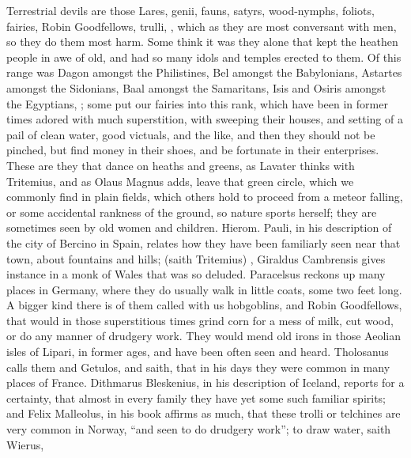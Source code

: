 Terrestrial devils are those Lares, genii, fauns, satyrs,
wood-nymphs, foliots, fairies, Robin Goodfellows, trulli,
\etc{}, which as they are most conversant with men, so they do them most harm.
Some think it was they alone that kept the heathen people in awe of old, and
had so many idols and temples erected to them. Of this range was Dagon amongst
the Philistines, Bel amongst the Babylonians, Astartes amongst the Sidonians,
Baal amongst the Samaritans, Isis and Osiris amongst the Egyptians, \etc{};
some put our fairies into this rank, which have been in
former times adored with much superstition, with sweeping their houses, and
setting of a pail of clean water, good victuals, and the like, and then they
should not be pinched, but find money in their shoes, and be fortunate in their
enterprises. These are they that dance on heaths and greens, as
Lavater thinks with Tritemius, and as
Olaus Magnus adds, leave that green circle, which we
commonly find in plain fields, which others hold to proceed from a meteor
falling, or some accidental rankness of the ground, so nature sports herself;
they are sometimes seen by old women and children. Hierom. Pauli, in his
description of the city of Bercino in Spain, relates how they have been
familiarly seen near that town, about fountains and hills; 
(saith Tritemius) , \etc{} Giraldus Cambrensis gives instance in
a monk of Wales that was so deluded. Paracelsus reckons up
many places in Germany, where they do usually walk in little coats, some two
feet long. A bigger kind there is of them called with us hobgoblins, and Robin
Goodfellows, that would in those superstitious times grind corn for a mess of
milk, cut wood, or do any manner of drudgery work. They would mend old irons in
those Aeolian isles of Lipari, in former ages, and have been often seen and
heard. Tholosanus calls them  and Getulos, and
saith, that in his days they were common in many places of France. Dithmarus
Bleskenius, in his description of Iceland, reports for a certainty, that almost
in every family they have yet some such familiar spirits; and Felix Malleolus,
in his book  affirms as much, that
these trolli or telchines are very common in Norway, \enquote{and
seen to do drudgery work}; to draw water, saith Wierus,

